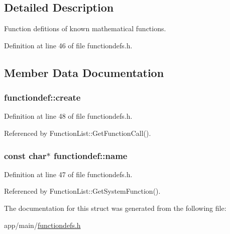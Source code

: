 \subsection{Detailed Description}
Function defitions of known mathematical functions. 

Definition at line 46 of file functiondefs.\+h.



\subsection{Member Data Documentation}
\subsubsection[{\texorpdfstring{create}{create}}]{ functiondef\+::create}\hypertarget{structfunctiondef_a323f2d4c5ae5923f8f76c76b3c77b42e}{}\label{structfunctiondef_a323f2d4c5ae5923f8f76c76b3c77b42e}


Definition at line 48 of file functiondefs.\+h.



Referenced by Function\+List\+::\+Get\+Function\+Call().

\subsubsection[{\texorpdfstring{name}{name}}]{\setlength{\rightskip}{0pt plus 5cm}const char$\ast$ functiondef\+::name}\hypertarget{structfunctiondef_ae17adb6289e2da9d1b68824afe49d210}{}\label{structfunctiondef_ae17adb6289e2da9d1b68824afe49d210}


Definition at line 47 of file functiondefs.\+h.



Referenced by Function\+List\+::\+Get\+System\+Function().



The documentation for this struct was generated from the following file\+:\begin{DoxyCompactItemize}
\item 
app/main/\hyperlink{functiondefs_8h}{functiondefs.\+h}\end{DoxyCompactItemize}
